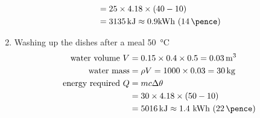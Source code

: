 \documentclass{article} %
\begin{document}
\begin{solution}
\begin{enumerate}[label=\alph*)]
\begin{align*}
            &=25\times 4.18\times (40-10)\\
            &=\SI{3135}{\kilo\joule}\approx 0.9 \text{kWh} \ (\SI{14}{\pence})
            \end{align*}
        \item Washing up the dishes after a meal
            \SI{50}{\celsius}
            \begin{align*}
            \text{water\ volume\ } V&=0.15\times 0.4\times 0.5 = \SI{0.03}{\metre\cubed}\\
            \text{water\ mass}&=\rho V=1000\times 0.03=\SI{30}{\kg}\\
            \text{energy\ required } Q &=mc\Delta\theta\\
            &=30\times 4.18\times (50-10)\\
            &=\SI{5016}{\kilo\joule}\approx 1.4\  \text{kWh} \ (\SI{22}{\pence})  
            \end{align*}
    \end{enumerate}
\end{solution}
\end{document}
